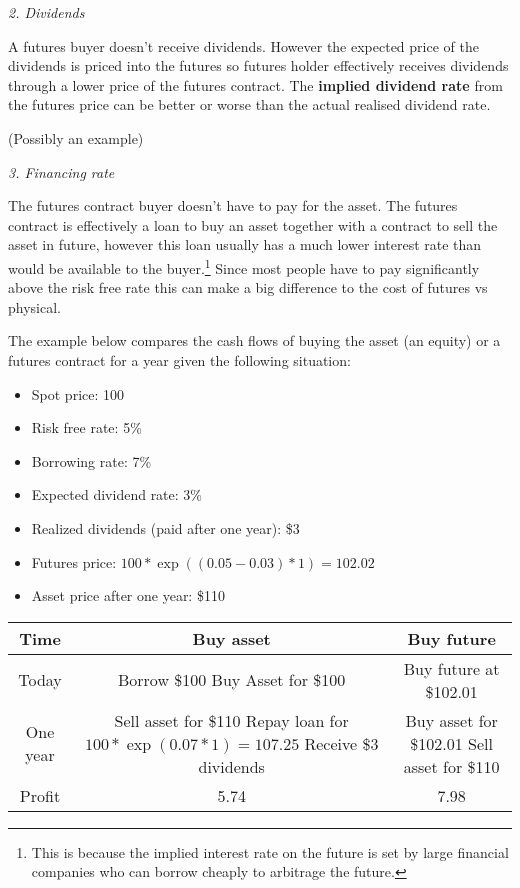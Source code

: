 \documentclass{tran-l}
\theoremstyle{definition}
\theoremstyle{remark}
\numberwithin{equation}{subsection}
\begin{document}
\medskip \textit{2. Dividends}

A futures buyer doesn't receive dividends. However the expected price of the dividends is priced into the futures so futures holder effectively receives dividends through a lower price of the futures contract. The \textbf{implied dividend rate} from the futures price can be better or worse than the actual realised dividend rate.

(Possibly an example)

\medskip \textit{3. Financing rate}

The futures contract buyer doesn't have to pay for the asset. The futures contract is effectively a loan to buy an asset together with a contract to sell the asset in future, however this loan usually has a much lower interest rate than would be available to the buyer.\footnote{This is because the implied interest rate on the future is set by large financial companies who can borrow cheaply to arbitrage the future.} Since most people have to pay significantly above the risk free rate this can make a big difference to the cost of futures vs physical.

The example below compares the cash flows of buying the asset (an equity) or a futures contract for a year given the following situation:

\begin{itemize}
\item Spot price: 100
\item Risk free rate: 5\%
\item Borrowing rate: 7\%
\item Expected dividend rate: 3\%
\item Realized dividends (paid after one year): \$3
\item Futures price: $100*\exp((0.05-0.03)*1)= 102.02$
\item Asset price after one year: \$110
\end{itemize}

\begin{tabular}{|c|c|c|}
\hline
Time & Buy asset & Buy future\\
\hline
Today & \shortstack{Borrow \$100\\ Buy Asset for \$100 }  & Buy future at \$102.01 \\
\hline
One year &  \shortstack{Sell asset for \$110\\ Repay loan for $100*\exp(0.07*1) = 107.25$\\ Receive \$3 dividends} & \shortstack{Buy asset for \$102.01\\ Sell asset for \$110} \\
\hline
Profit & 5.74 &  7.98 \\
\hline
\end{tabular}
\end{document}
